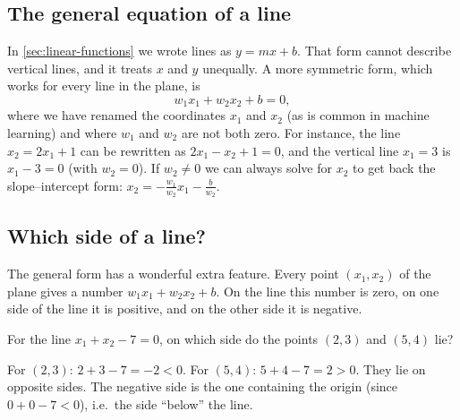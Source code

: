 \subsection{The general equation of a line}

In \cref{sec:linear-functions} we wrote lines as $y = mx + b$. That form cannot
describe vertical lines, and it treats $x$ and $y$ unequally. A more symmetric
form, which works for every line in the plane, is
\[
  w_1 x_1 + w_2 x_2 + b = 0,
\]
where we have renamed the coordinates $x_1$ and $x_2$ (as is common in machine
learning) and where $w_1$ and $w_2$ are not both zero. For instance, the line
$x_2 = 2x_1 + 1$ can be rewritten as $2x_1 - x_2 + 1 = 0$, and the vertical
line $x_1 = 3$ is $x_1 - 3 = 0$ (with $w_2 = 0$). If $w_2 \neq 0$ we can always
solve for $x_2$ to get back the slope--intercept form:
$x_2 = -\frac{w_1}{w_2}x_1 - \frac{b}{w_2}$.

\subsection{Which side of a line?}

The general form has a wonderful extra feature. Every point $(x_1, x_2)$ of the
plane gives a number $w_1x_1 + w_2x_2 + b$. On the line this number is zero,
on one side of the line it is positive, and on the other side it is negative.

\begin{example}\label{ex:side-of-line}
For the line $x_1 + x_2 - 7 = 0$, on which side do the points $(2, 3)$ and
$(5, 4)$ lie?

\sol For $(2, 3)$: $2 + 3 - 7 = -2 < 0$. For $(5, 4)$: $5 + 4 - 7 = 2 > 0$.
They lie on opposite sides. The negative side is the one containing the
origin (since $0 + 0 - 7 < 0$), i.e.\ the side ``below'' the line.
\end{example}

